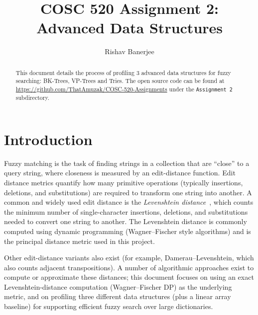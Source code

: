 \documentclass[acmsmall,screen, nonacm]{acmart}
\begin{document}
\title{COSC 520 Assignment 2: Advanced Data Structures}

\author{Rishav Banerjee}

\renewcommand{\shortauthors}{Banerjee}

\begin{abstract}
	This document details the process of profiling 3 advanced data structures for fuzzy searching: BK-Trees, VP-Trees and Tries.
	The open source code can be found at \url{https://github.com/ThatAmuzak/COSC-520-Assignments} under the \texttt{Assignment 2} subdirectory.
\end{abstract}

\received{\today}

\maketitle

\section{Introduction}

Fuzzy matching is the task of finding strings in a collection that are ``close'' to a query string, where closeness is measured by an edit-distance function.
Edit distance metrics quantify how many primitive operations (typically insertions, deletions, and substitutions) are required to transform one string into another.
A common and widely used edit distance is the \emph{Levenshtein distance}~\cite{wikipediaLevenshteinDistance}, which counts the minimum number of single-character insertions, deletions, and substitutions needed to convert one string to another.
The Levenshtein distance is commonly computed using dynamic programming (Wagner--Fischer style algorithms) and is the principal distance metric used in this project.

Other edit-distance variants also exist (for example, Damerau--Levenshtein, which also counts adjacent transpositions). A number of algorithmic approaches exist to compute or approximate these distances; this document focuses on using an exact Levenshtein-distance computation (Wagner--Fischer DP) as the underlying metric, and on profiling three different data structures (plus a linear array baseline) for supporting efficient fuzzy search over large dictionaries.
\end{document}
